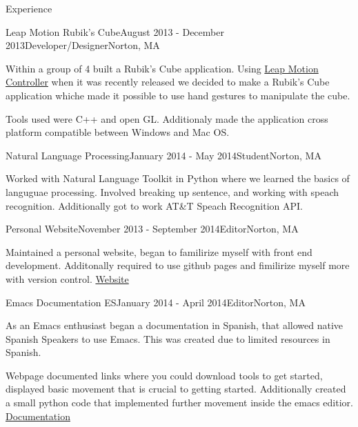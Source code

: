 \documentclass{resume} %
\begin{document}
\begin{rSection}{Experience}

\begin{rSubsection}{Leap Motion Rubik's Cube}{August 2013 - December 2013}{Developer/Designer}{Norton, MA}
\item Within a group of 4 built a Rubik's Cube application. Using \href{https://www.leapmotion.com/}{Leap Motion Controller} when it was recently released we decided to make a Rubik's Cube application whiche made it possible to use hand gestures to manipulate the cube. 

\item Tools used were C++  and open GL. Additionaly made the application cross platform compatible between Windows and Mac OS.  

\end{rSubsection}


\begin{rSubsection}{Natural Language Processing}{January 2014 - May 2014}{Student}{Norton, MA}
\item Worked with Natural Language Toolkit in Python where we learned the basics of languguae processing.  Involved breaking up sentence, and working with speach recognition. Additionally got to work AT\&T Speach Recognition API. 


\end{rSubsection}
\begin{rSubsection}{Personal Website}{November 2013 - September 2014}{Editor}{Norton, MA}
\item  Maintained a personal website, began to familirize myself with front end development. Additonally required to use github pages and fimilirize myself more with version control. \href{http://guti15.github.io/}{Website}


\end{rSubsection}


\begin{rSubsection}{Emacs Documentation ES}{January 2014 - April 2014}{Editor}{Norton, MA}
\item As an Emacs enthusiast began a documentation in Spanish, that allowed native Spanish Speakers to use Emacs.  This was created due to limited resources in Spanish. 
\item Webpage documented links where you could download tools to get started, displayed basic movement that is crucial to getting started.  Additionally created a small python code that implemented further movement inside the emacs editior. \href{http://guti15.github.io/Emacs_Documentation_es/Intro.html}{Documentation}


\end{rSubsection}
\end{rSection}
\end{document}
